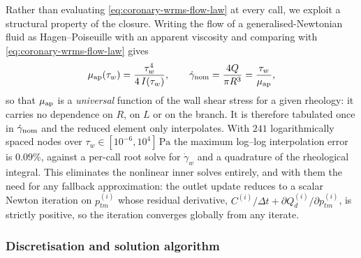 \documentclass[lineno]{jfm}
\begin{document}
Rather than evaluating \eqref{eq:coronary-wrms-flow-law} at every call, we exploit
a structural property of the closure. Writing the flow of a
generalised-Newtonian fluid as Hagen--Poiseuille with an apparent viscosity and
comparing with \eqref{eq:coronary-wrms-flow-law} gives
\begin{equation}
\mu_{\rm ap}(\tau_w)=\frac{\tau_w^{4}}{4\,I(\tau_w)},
\qquad
\dot{\gamma}_{\rm nom}=\frac{4Q}{\pi R^{3}}=\frac{\tau_w}{\mu_{\rm ap}},
\label{eq:mu-apparent}
\end{equation}
so that $\mu_{\rm ap}$ is a \emph{universal} function of the wall shear stress for
a given rheology: it carries no dependence on $R$, on $L$ or on the branch. It is
therefore tabulated once in $\dot{\gamma}_{\rm nom}$ and the reduced element only
interpolates. With $241$ logarithmically spaced nodes over
$\tau_w\in[10^{-6},10^{4}]\,\mathrm{Pa}$ the maximum log--log interpolation error
is $0.09\%$, against a per-call root solve for $\dot{\gamma}_w$ and a quadrature
of the rheological integral. This eliminates the nonlinear inner solves entirely,
and with them the need for any fallback approximation: the outlet update reduces to
a scalar Newton iteration on $p_{tm}^{(i)}$ whose residual derivative,
$C^{(i)}/\Delta t+\partial Q_{d}^{(i)}/\partial p_{tm}^{(i)}$, is strictly
positive, so the iteration converges globally from any iterate.

\subsubsection{Discretisation and solution algorithm}
\label{sec:coronary-numerics}
\end{document}
